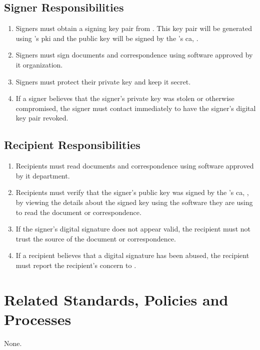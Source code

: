 \subsection{Signer Responsibilities}
\begin{enumerate}
\item 
Signers must obtain a signing key pair from .  This key pair will be generated using \CompanyName{}'s \gls{pki} and the public key will be signed by the \CompanyName{}'s \gls{ca}, \CertificateAuthority{}.
\item 
Signers must sign documents and correspondence using software approved by \CompanyName{} \gls{it} organization.
\item 
Signers must protect their private key and keep it secret.
\item 
If a signer believes that the signer's private key was stolen or otherwise compromised, the signer must contact \CompanyName{} \IdentityManagementGroup{} immediately to have the signer's digital key pair revoked.
\end{enumerate}
\subsection{Recipient Responsibilities}
\begin{enumerate}
\item 
Recipients must read documents and correspondence using software approved by \CompanyName{} \gls{it} department.
\item 
Recipients must verify that the signer's public key was signed by the \CompanyName{}'s \gls{ca}, \CertificateAuthority{}, by viewing the details about the signed key using the software they are using to read the document or correspondence.
\item 
If the signer's digital signature does not appear valid, the recipient must not trust the source of the document or correspondence.
\item 
If a recipient believes that a digital signature has been abused, the recipient must report the recipient's concern to \CompanyName{} \IdentityManagementGroup{}.
\end{enumerate}
\CommonPolicyCompliance
\section{Related Standards, Policies and Processes}
None.
